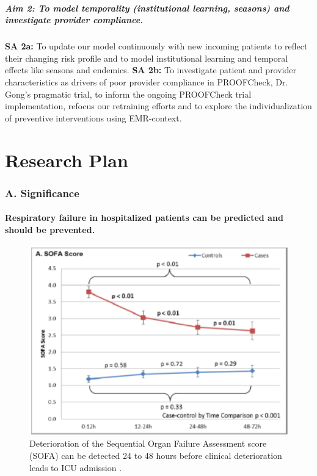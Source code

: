 \documentclass[11pt,notitlepage]{article}
\begin{document}
\subsubsection*{Aim 2: To model temporality (institutional learning, seasons) and investigate provider compliance.}
\textbf{SA 2a:} To update our model continuously with new incoming patients to reflect their changing risk profile and to model institutional learning and temporal effects like seasons and endemics. 
\newline \textbf{SA 2b:} To investigate patient and provider characteristics as drivers of poor provider compliance in PROOFCheck, Dr. Gong's pragmatic trial, to inform the ongoing PROOFCheck trial implementation, refocus our retraining efforts and to explore the individualization of preventive interventions using EMR-context. 
\part*{Research Plan}

\section*{A. Significance}

\subsection*{Respiratory failure in hospitalized patients can be predicted and should be prevented.} 

\begin{figure}
 \vspace{-70pt}
 \includegraphics[scale=0.7]{Figures/SOFA_fig.png}
  \vspace{-30pt}
  \caption{\footnotesize Deterioration of the Sequential Organ Failure Assessment score (SOFA) can be detected 24 to 48 hours before clinical deterioration leads to ICU admission \cite{Yu_24970344}.}
    \label{fig:SOFA_fig}
 \vspace{-20pt}
\end{figure}
\end{document}
